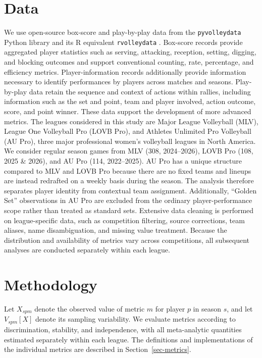 \documentclass[
  12pt]{article}
\begin{document}
\section{Data}\label{data}

We use open-source box-score and play-by-play data from the
\texttt{pyvolleydata} Python library \citep{awosoga_pyvolleydata_2026}
and its R equivalent \texttt{rvolleydata}
\citep{awosoga_rvolleydata_2026}. Box-score records provide aggregated
player statistics such as serving, attacking, reception, setting,
digging, and blocking outcomes and support conventional counting, rate,
percentage, and efficiency metrics. Player-information records
additionally provide information necessary to identify performances by
players across matches and seasons. Play-by-play data retain the
sequence and context of actions within rallies, including information
such as the set and point, team and player involved, action outcome,
score, and point winner. These data support the development of more
advanced metrics. The leagues considered in this study are Major League
Volleyball (MLV), League One Volleyball Pro (LOVB Pro), and Athletes
Unlimited Pro Volleyball (AU Pro), three major professional women's
volleyball leagues in North America. We consider regular season games
from MLV (308, 2024--2026), LOVB Pro (108, 2025 \& 2026), and AU Pro
(114, 2022--2025). AU Pro has a unique structure compared to MLV and
LOVB Pro because there are no fixed teams and lineups are instead
redrafted on a weekly basis during the season. The analysis therefore
separates player identity from contextual team assignment. Additionally,
``Golden Set'' observations in AU Pro are excluded from the ordinary
player-performance scope rather than treated as standard sets. Extensive
data cleaning is performed on league-specific data, such as competition
filtering, source corrections, team aliases, name disambiguation, and
missing value treatment. Because the distribution and availability of
metrics vary across competitions, all subsequent analyses are conducted
separately within each league.

\section{Methodology}\label{methodology}

Let \(X_{spm}\) denote the observed value of metric \(m\) for player
\(p\) in season \(s\), and let \(V_{spm}[X]\) denote its sampling
variability. We evaluate metrics according to discrimination, stability,
and independence, with all meta-analytic quantities estimated separately
within each league. The definitions and implementations of the
individual metrics are described in Section~\ref{sec-metrics}.
\end{document}

